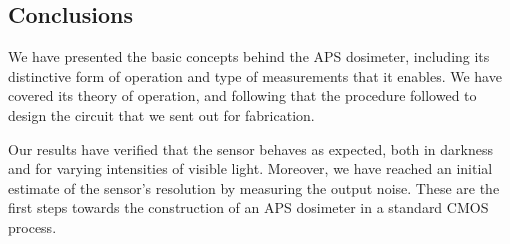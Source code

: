 \subsection{Conclusions}
We have presented the basic concepts behind the APS dosimeter,
including its distinctive form of operation and type of measurements that it enables.
We have covered its theory of operation,
and following that the procedure followed to design the circuit that we sent out for fabrication.

Our results have verified that the sensor
behaves as expected, both in darkness and for varying intensities of visible light.
Moreover, we have reached an initial estimate of the sensor's resolution
by measuring the output noise.
These are the first steps towards the construction of an APS dosimeter in a standard CMOS process.
